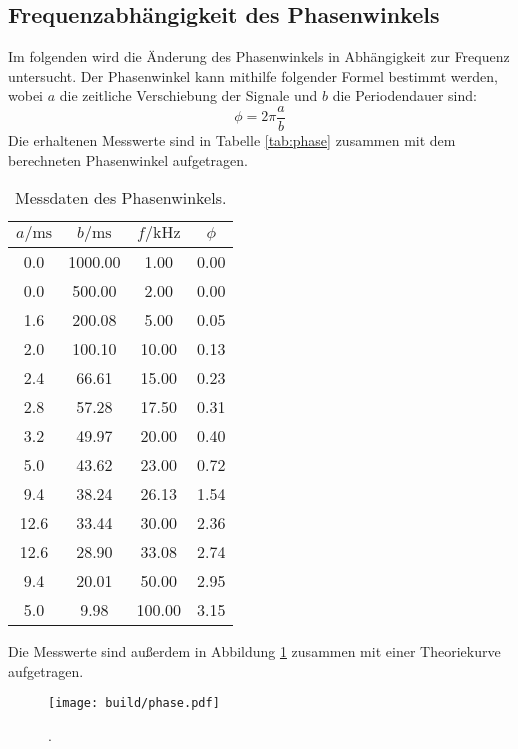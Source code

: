 \subsection{Frequenzabhängigkeit des Phasenwinkels}
Im folgenden wird die Änderung des Phasenwinkels in Abhängigkeit zur Frequenz untersucht.
Der Phasenwinkel kann mithilfe folgender Formel bestimmt werden, wobei $a$ die zeitliche Verschiebung
der Signale und $b$ die Periodendauer sind:
\begin{equation}
    \phi = 2\pi \frac{a}{b}
\end{equation}
Die erhaltenen Messwerte sind in Tabelle \ref{tab:phase} zusammen mit dem berechneten Phasenwinkel
aufgetragen.
\begin{table}[H]
        \caption{Messdaten des Phasenwinkels.}
        \label{tab:phasetab}
        \centering
        \begin{tabular}{S[table-format=2.1(0)e0] S[table-format=4.2(0)e0] S[table-format=3.2(0)e0] S[table-format=1.2]}
                \toprule
                {$a/\si{\milli\second}$} & {$b/\si{\milli\second}$} & {$f/\si{\kilo\hertz}$} & {$\phi$} \\
                     & 1000.00   & 1.00  & 0.00\\
                0.0     & 500.00    & 2.00  & 0.00\\
                1.6     & 200.08    & 5.00  & 0.05\\
                2.0     & 100.10    & 10.00 & 0.13\\
                2.4     & 66.61     & 15.00 & 0.23\\
                2.8     & 57.28     & 17.50 & 0.31\\
                3.2     & 49.97     & 20.00 & 0.40\\
                5.0     & 43.62     & 23.00 & 0.72\\
                9.4     & 38.24     & 26.13 & 1.54\\
                12.6    & 33.44     & 30.00 & 2.36\\
                12.6    & 28.90     & 33.08 & 2.74\\
                9.4     & 20.01     & 50.00 & 2.95\\
                5.0     & 9.98      & 100.00& 3.15\\
                \bottomrule
        \end{tabular}
\end{table}
\noindent
Die Messwerte sind außerdem in Abbildung \ref{fig:freq} zusammen mit einer Theoriekurve aufgetragen.
\begin{figure}[H]
    \centering
    \caption{.}
    \label{fig:freq}
    \texttt{[image: build/phase.pdf]}
\end{figure}
\noindent
%

